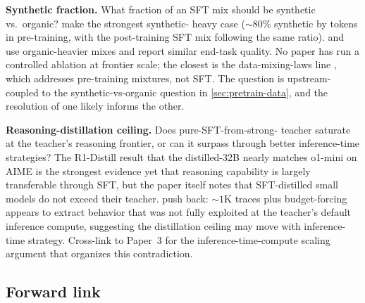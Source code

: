 \begin{contradiction}
\textbf{Synthetic fraction.} What fraction of an SFT mix should be
synthetic vs.\ organic? \citet{phi4} make the strongest synthetic-
heavy case ($\sim\!80\%$ synthetic by tokens in pre-training, with
the post-training SFT mix following the same ratio). \citet{tulu3}
and \citet{meta-llama3} use organic-heavier mixes and report similar
end-task quality. No paper has run a controlled ablation at frontier
scale; the closest is the data-mixing-laws line
\citep{data-mixing-laws-2024}, which addresses pre-training mixtures,
not SFT. The question is upstream-coupled to the synthetic-vs-organic
question in \cref{sec:pretrain-data}, and the resolution of one
likely informs the other.
\end{contradiction}

\begin{contradiction}
\textbf{Reasoning-distillation ceiling.} Does pure-SFT-from-strong-
teacher saturate at the teacher's reasoning frontier, or can it
surpass through better inference-time strategies? The R1-Distill
result \citep[\S 4]{deepseek-r1} that the distilled-32B nearly matches
o1-mini on AIME is the strongest evidence yet that reasoning
capability is largely transferable through SFT, but the paper itself
notes that SFT-distilled small models do not exceed their teacher.
\citet{s1-2025} push back: $\sim\!1$K traces plus budget-forcing
appears to extract behavior that was not fully exploited at the
teacher's default inference compute, suggesting the distillation
ceiling may move with inference-time strategy. Cross-link to Paper~3
for the inference-time-compute scaling argument that organizes this
contradiction.
\end{contradiction}

\subsection{Forward link}
\label{sec:sft-forward}

